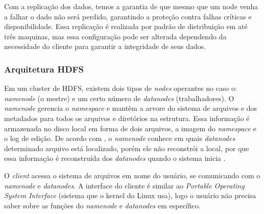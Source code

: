                 Com a replicação dos dados, temos a garantia de que mesmo que um node venha a falhar o
                dado não será perdido, garantindo a proteção contra falhas críticas e disponibilidade. Essa
                replicação é realizada por padrão de distribuição em até três maquinas, mas essa configuração
                pode ser alterada dependendo da necessidade do cliente para garantir a integridade de seus dados.

            \subsubsection{Arquitetura HDFS}

                Em um cluster de HDFS, existem dois tipos de \textit{nodes} operantes no caso o: \textit{namenode}
                (o mestre) e um certo número de \textit{datanodes} (trabalhadores). O \textit{namenode} gerencia
                o \textit{namespace} e mantêm a arvore do sistema de arquivos e dos metadados para todos os arquivos
                e diretórios na estrutura. Essa informação é armazenada no disco local em forma de dois arquivos, a
                imagem do \textit{namespace} e o log de edição. De acordo com , o \textit{namenode}
                conhece em quais \textit{datanodes}  determinado arquivo está localizado, porém ele não reconstrói a local,
                por que essa informação é reconstruída dos \textit{datanodes} quando o sistema inicia \cite{white2015}.

                O \textit{client} acessa o sistema de arquivos em nome do usuário, se comunicando com o \textit{namenode}
                e \textit{datanodes}. A interface do cliente é similar ao \textit{Portable Operating System Interface} (sistema
                que o kernel do Linux usa), logo o usuário não precisa saber sobre as funções do \textit{namenode} e
                \textit{datanodes} em específico.

